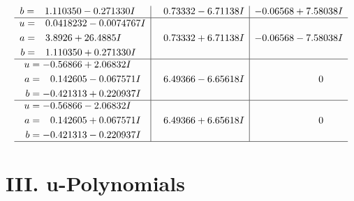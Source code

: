 \documentclass[1p]{elsarticle_modified}
\theoremstyle{definition}
\begin{document}
$$\begin{array}{c|c|c}
\begin{aligned}
b &= \phantom{-}1.110350 - 0.271330 I\end{aligned}
 & \phantom{-}0.73332 - 6.71138 I & -0.06568 + 7.58038 I \\ \hline\begin{aligned}
u &= \phantom{-}0.0418232 - 0.0074767 I \\
a &= \phantom{-}3.8926 + 26.4885 I \\
b &= \phantom{-}1.110350 + 0.271330 I\end{aligned}
 & \phantom{-}0.73332 + 6.71138 I & -0.06568 - 7.58038 I \\ \hline\begin{aligned}
u &= -0.56866 + 2.06832 I \\
a &= \phantom{-}0.142605 - 0.067571 I \\
b &= -0.421313 + 0.220937 I\end{aligned}
 & \phantom{-}6.49366 - 6.65618 I & \phantom{-0.000000 } 0 \\ \hline\begin{aligned}
u &= -0.56866 - 2.06832 I \\
a &= \phantom{-}0.142605 + 0.067571 I \\
b &= -0.421313 - 0.220937 I\end{aligned}
 & \phantom{-}6.49366 + 6.65618 I & \phantom{-0.000000 } 0\\
 \hline 
 \end{array}$$\newpage
\newpage\renewcommand{\arraystretch}{1}
\centering \section*{ III. u-Polynomials}
\end{document}
